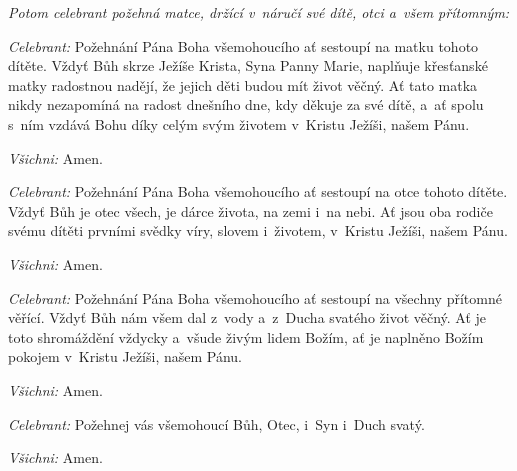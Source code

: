 \pars{}

\textit{Potom celebrant požehná matce, držící v~náručí své dítě, otci a~všem
přítomným:}

\textit{Celebrant:} Požehnání Pána Boha všemohoucího ať sestoupí na matku tohoto dítěte.
Vždyť Bůh skrze Ježíše Krista, Syna Panny Marie, naplňuje křesťanské matky radostnou nadějí,
že jejich děti budou mít život věčný. Ať tato matka nikdy nezapomíná na radost dnešního dne,
kdy děkuje za své dítě, a~ať spolu s~ním vzdává Bohu díky celým svým životem v~Kristu Ježíši,
našem Pánu.

\textit{Všichni:} Amen.

\textit{Celebrant:} Požehnání Pána Boha všemohoucího ať sestoupí na otce tohoto dítěte.
Vždyť Bůh je otec všech, je dárce života, na zemi i~na nebi.
Ať jsou oba rodiče svému dítěti prvními svědky víry, slovem i~životem, v~Kristu Ježíši, našem Pánu.

\textit{Všichni:} Amen.

\textit{Celebrant:} Požehnání Pána Boha všemohoucího ať sestoupí na všechny přítomné věřící.
Vždyť Bůh nám všem dal z~vody a~z~Ducha svatého život věčný. Ať je toto shromáždění vždycky
a~všude živým lidem Božím, ať je naplněno Božím pokojem v~Kristu Ježíši, našem Pánu.

\textit{Všichni:} Amen.

\textit{Celebrant:} Požehnej vás všemohoucí Bůh,
Otec, i~Syn \grecross{} i~Duch svatý.

\textit{Všichni:} Amen.
